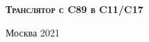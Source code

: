\begin{titlepage}
\newpage

\begin{center}

\end{center}

\vspace{8em}

\begin{center}
\Large \textsc{\textbf{Транслятор с C89 в C11/C17}}  \\ 
\end{center}

\vspace{2em}

\vspace{6em}



\vspace{\fill}

\begin{center}
Москва 2021
\end{center}

\end{titlepage}